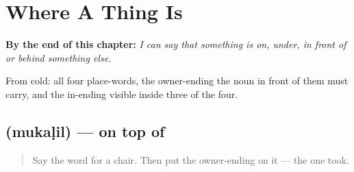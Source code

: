 
\chapter{Where A Thing Is}
\label{ch:ml-place-words}

\begin{chapteropening}
\textbf{By the end of this chapter:} \emph{I can say that something is on, under, in front of or behind something else.}

From cold: all four place-words, the owner-ending the noun in front of them must carry, and the in-ending visible inside three of the four.
\end{chapteropening}

\section[\texorpdfstring{\ml{മുകളിൽ} (mukaḷil)}{മുകളിൽ (mukaḷil)}]{ (mukaḷil) — on top of}

\label{lesson:ML-C84-mukalil}



\begin{quote}
Say the word for a chair. Then put the owner-ending on it — the one \textbf{} took.
\end{quote}

